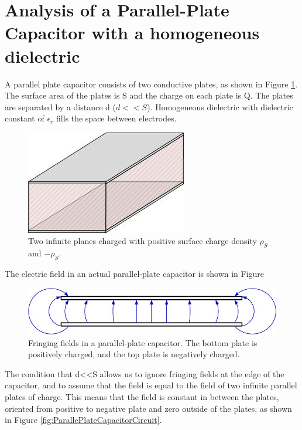 \documentclass{ximera}
\begin{document}
\section{Analysis of a Parallel-Plate Capacitor with a homogeneous dielectric}


A parallel plate capacitor consists of two conductive plates, as shown in Figure \ref{fig:ParallePlateCapacitorPlain}. The surface area of the plates is S and the charge on each plate is Q. The plates are separated by a distance d ($d<<S$). Homogeneous dielectric with dielectric constant of $\epsilon_r$ fills the space between electrodes.



\begin{figure}[htbp]
\begin{center}
\includegraphics[scale=0.8]{../jpg/ppw.jpg}
\end{center}
\caption{Two infinite planes charged with positive surface charge density $\rho_S$ and $-\rho_S.$}
\label{fig:ParallePlateCapacitorPlain}
\end{figure}

The electric field in an actual parallel-plate capacitor is shown in Figure 

\begin{figure}[htbp]
\begin{center}
\includegraphics[scale=0.5]{../jpg/Fringing_Fields_For_Finite_Capacitor.jpg}
\end{center}
\caption{Fringing fields in a parallel-plate capacitor. The bottom plate is positively charged, and the top plate is negatively charged.}
\label{fig:FiringinFields}
\end{figure}

The condition that d<<S allows us to ignore fringing fields at the edge of the capacitor, and to assume that the field is equal to the field of two infinite parallel plates of charge. This means that the field is constant in between the plates, oriented from positive to negative plate and zero outside of the plates, as shown in Figure \ref{fig:ParallePlateCapacitorCircuit}.  
\end{document}
